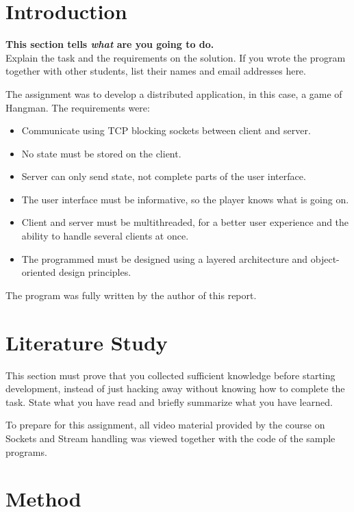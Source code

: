 \documentclass[a4paper]{scrartcl}
\begin{document}
\section{Introduction}

\textbf{This section tells \textit{what} are you going to do.} \\

\noindent Explain the task and the requirements on the solution. If you wrote the program together with other students, list their names and email addresses here.

\noindent The assignment was to develop a distributed application, in this case, a game of Hangman. The requirements were:

\begin{itemize}
    \item Communicate using TCP blocking sockets between client and server.
    \item No state must be stored on the client.
    \item Server can only send state, not complete parts of the user interface.
    \item The user interface must be informative, so the player knows what is going on.
    \item Client and server must be multithreaded, for a better user experience and the ability to handle several clients at once.
    \item The programmed must be designed using a layered architecture and object-oriented design principles.
\end{itemize}

The program was fully written by the author of this report.

\section{Literature Study}

This section must prove that you collected sufficient knowledge before starting development, instead of just hacking away without knowing how to complete the task. State what you have read and briefly summarize what you have learned.

To prepare for this assignment, all video material provided by the course on Sockets and Stream handling was viewed together with the code of the sample programs.

\section{Method}
\end{document}
